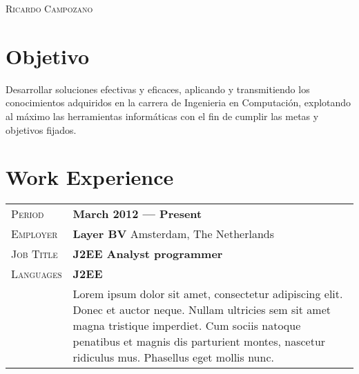 \documentclass[a4paper, oneside, final]{scrartcl} %
\newcommand{\gray}{\rowcolor[gray]{.90}} %
\begin{document}
\begin{center} %


{\fontsize{36}{36}\selectfont\scshape Ricardo Campozano} %

\vspace{1.5cm} %


\section{Objetivo}

Desarrollar soluciones efectivas y eficaces,  aplicando y transmitiendo los conocimientos adquiridos en la carrera de Ingenieria en Computación, explotando al máximo las herramientas informáticas con el fin de cumplir las metas y objetivos fijados.


\section{Work Experience}

\begin{tabularx}{0.97\linewidth}{>{\raggedleft\scshape}p{2cm}X}
\gray Period & \textbf{March 2012 --- Present}\\
\gray Employer & \textbf{Layer BV} \hfill Amsterdam, The Netherlands\\
\gray Job Title & \textbf{J2EE Analyst programmer}\\
\gray Languages & \textbf{J2EE}\\
& Lorem ipsum dolor sit amet, consectetur adipiscing elit. Donec et auctor neque. Nullam ultricies sem sit amet magna tristique imperdiet. Cum sociis natoque penatibus et magnis dis parturient montes, nascetur ridiculus mus. Phasellus eget mollis nunc.
\end{tabularx}


\end{center}
\end{document}

